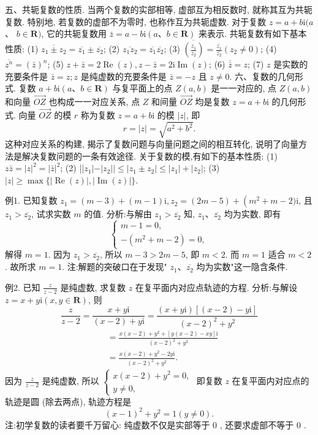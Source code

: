 五、共轭复数的性质.
当两个复数的实部相等, 虚部互为相反数时, 就称其互为共轭复数.
特别地, 若复数的虚部不为零时, 也称作互为共轭虚数.
对于复数 $z=a+b \mathrm{i}(a$ 、 $b \in \mathbf{R})$, 它的共轭复数用 $\bar{z}=a-b \mathrm{i}(a 、 b \in \mathbf{R})$ 来表示.
共轭复数有如下基本性质:
(1) $\overline{z_1 \pm z_2}=\overline{z_1} \pm \overline{z_2}$;
(2) $\overline{z_1 z_2}=\overline{z_1} \overline{z_2}$;
(3) $\overline{\left(\frac{z_1}{z_2}\right)}=\frac{\overline{z_1}}{\overline{z_2}}\left(z_2 \neq 0\right)$;
(4) $\overline{z^n}=(\bar{z})^n$;
(5) $z+\bar{z}=2 \operatorname{Re}(z), z-\bar{z}=2 \mathrm{i} \operatorname{Im}(z)$;
(6) $\overline{\bar{z}}=z$;
(7) $z$ 是实数的充要条件是 $\bar{z}=z ; z$ 是纯虚数的充要条件是 $\bar{z}=-z$ 且 $z \neq 0$.
六、复数的几何形式.
复数 $a+b \mathrm{i}(a 、 b \in \mathbf{R})$ 与复平面上的点 $Z(a, b)$ 是一一对应的, 点 $Z(a, b)$ 和向量 $\overrightarrow{O Z}$ 也构成一一对应关系, 点 $Z$ 和间量 $\overrightarrow{O Z}$ 均是复数 $z=a+b \mathrm{i}$ 的几何形式.
向量 $\overrightarrow{O Z}$ 的模 $r$ 称为复数 $z=a+b \mathrm{i}$ 的模 $|z|$, 即
$$
r=|z|=\sqrt{a^2+b^2} .
$$
这种对应关系的构建, 揭示了复数问题与向量问题之间的相互转化, 说明了向量方法是解决复数问题的一条有效途径.
关于复数的模,有如下的基本性质:
(1) $z \bar{z}=|z|^2=|\bar{z}|^2$;
(2) ||$z_1|-| z_2|| \leqslant\left|z_1 \pm z_2\right| \leqslant\left|z_1\right|+\left|z_2\right|$;
(3) $|z| \geqslant \max \{|\operatorname{Re}(z)|,|\operatorname{Im}(z)|\}$.



例1. 已知复数 $z_1=(m-3)+(m-1) \mathrm{i}, z_2=(2 m-5)+\left(m^2+m-\right. 2) \mathrm{i}$, 且 $z_1>\overline{z_2}$, 试求实数 $m$ 的值.
分析:与解由 $z_1>\overline{z_2}$ 知, $z_1 、 \overline{z_2}$ 均为实数, 即有
$$
\left\{\begin{array}{l}
m-1=0, \\
-\left(m^2+m-2\right)=0,
\end{array}\right.
$$
解得 $m=1$.
因为 $z_1>\overline{z_2}$, 所以 $m-3>2 m-5$, 即 $m<2$. 而 $m=1$ 适合 $m<2$. 故所求 $m=1$.
注:解题的突破口在于发现" $z_1 、 \overline{z_2}$ 均为实数"这一隐含条件.



例2. 已知 $\frac{z}{z-2}$ 是纯虚数, 求复数 $z$ 在复平面内对应点轨迹的方程.
分析:与解设 $z=x+y \mathrm{i}(x, y \in \mathbf{R})$, 则
$$
\frac{z}{z-2}=\frac{x+y \mathrm{i}}{(x-2)+y \mathrm{i}}=\frac{(x+y \mathrm{i})[(x-2)-y \mathrm{i}]}{(x-2)^2+y^2}
$$
$$
\begin{aligned}
& =\frac{x(x-2)+y^2+[y(x-2)-x y] \mathrm{i}}{(x-2)^2+y^2} \\
& =\frac{x(x-2)+y^2-2 y \mathrm{i}}{(x-2)^2+y^2} .
\end{aligned}
$$
因为 $\frac{z}{z-2}$ 是纯虚数, 所以 $\left\{\begin{array}{l}x(x-2)+y^2=0, \\ y \neq 0,\end{array}\right.$ 即复数 $z$ 在复平面内对应点的轨迹是圆 (除去两点), 轨迹方程是
$$
(x-1)^2+y^2=1(y \neq 0) .
$$
注:初学复数的读者要千万留心: 纯虚数不仅是实部等于 0 , 还要求虚部不等于 0 .



